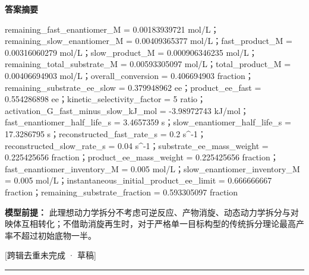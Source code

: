 \documentclass[UTF8,11pt,a4paper]{ctexart}
\begin{document}
\noindent\textbf{答案摘要}\par
remaining\_fast\_enantiomer\_M = 0.00183939721 mol/L；remaining\_slow\_enantiomer\_M = 0.00409365377 mol/L；fast\_product\_M = 0.00316060279 mol/L；slow\_product\_M = 0.000906346235 mol/L；remaining\_total\_substrate\_M = 0.00593305097 mol/L；total\_product\_M = 0.00406694903 mol/L；overall\_conversion = 0.406694903 fraction；remaining\_substrate\_ee\_slow = 0.379948962 ee；product\_ee\_fast = 0.554286898 ee；kinetic\_selectivity\_factor = 5 ratio；activation\_G\_fast\_minus\_slow\_kJ\_mol = -3.98972743 kJ/mol；fast\_enantiomer\_half\_life\_s = 3.4657359 s；slow\_enantiomer\_half\_life\_s = 17.3286795 s；reconstructed\_fast\_rate\_s = 0.2 s\textasciicircum{}-1；reconstructed\_slow\_rate\_s = 0.04 s\textasciicircum{}-1；substrate\_ee\_mass\_weight = 0.225425656 fraction；product\_ee\_mass\_weight = 0.225425656 fraction；fast\_enantiomer\_inventory\_M = 0.005 mol/L；slow\_enantiomer\_inventory\_M = 0.005 mol/L；instantaneous\_initial\_product\_ee\_limit = 0.666666667 fraction；remaining\_substrate\_fraction = 0.593305097 fraction\par
\noindent\textbf{模型前提：}
此理想动力学拆分不考虑可逆反应、产物消旋、动态动力学拆分与对映体互相转化；不借助消旋再生时，对于严格单一目标构型的传统拆分理论最高产率不超过初始底物一半。\par
\noindent\textcolor{red!65!black}{[跨辑去重未完成 · 草稿]} \par
\medskip\hrule\medskip
{}
\end{document}
